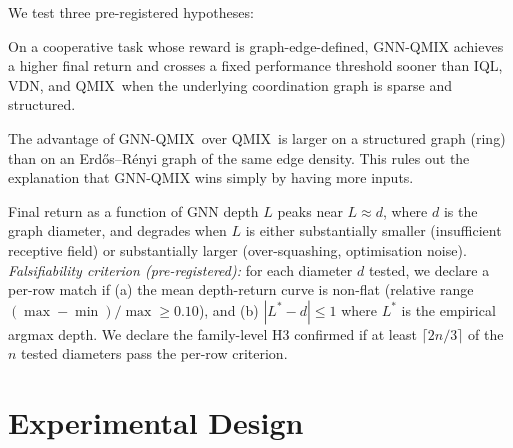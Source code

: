 \documentclass[10pt]{article}
\newcommand{\algoname}[1]{\textsc{#1}}
\newcommand{\iql}{\algoname{IQL}}
\newcommand{\vdn}{\algoname{VDN}}
\newcommand{\qmix}{\algoname{QMIX}}
\newcommand{\gnnqmix}{\algoname{GNN-QMIX}}
\newcommand{\coordgrid}{\textsc{CoordGrid}}
\begin{document}
We test three pre-registered hypotheses:

\begin{description}[leftmargin=4em,style=nextline]
  \item[\textbf{H1 (structure beats no-structure):}]
    On a cooperative task whose reward is graph-edge-defined, \gnnqmix
    achieves a higher final return and crosses a fixed performance
    threshold sooner than \iql, \vdn, and \qmix\ when the underlying
    coordination graph is sparse and structured.
  \item[\textbf{H2 (structure $>$ matched-density random):}]
    The advantage of \gnnqmix\ over \qmix\ is larger on a structured
    graph (ring) than on an Erd\H{o}s--R\'enyi graph of the same edge
    density. This rules out the explanation that GNN-QMIX wins simply by
    having more inputs.
  \item[\textbf{H3 (depth--diameter inverted-U):}]
    Final return as a function of GNN depth $L$ peaks near $L \approx d$,
    where $d$ is the graph diameter, and degrades when $L$ is either
    substantially smaller (insufficient receptive field) or substantially
    larger (over-squashing, optimisation noise). \emph{Falsifiability
    criterion (pre-registered):} for each diameter $d$ tested, we declare
    a per-row match if (a) the mean depth-return curve is non-flat
    (relative range $(\max - \min)/\max \ge 0.10$), and (b) $|L^* - d|
    \le 1$ where $L^*$ is the empirical argmax depth. We declare the
    family-level H3 confirmed if at least $\lceil 2n/3 \rceil$ of the $n$
    tested diameters pass the per-row criterion.
\end{description}

\section{Experimental Design}
\label{sec:design}

\end{document}
